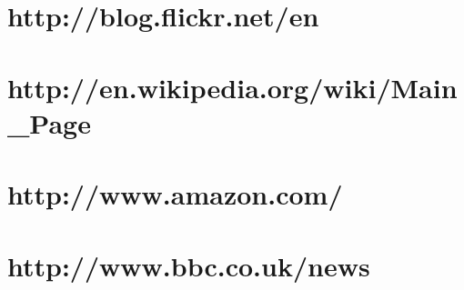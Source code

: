 \documentclass{article}
\begin{document}
  \maketitle
  \tableofcontents

\section{http://blog.flickr.net/en}














\section{http://en.wikipedia.org/wiki/Main_Page}














\section{http://www.amazon.com/}














\section{http://www.bbc.co.uk/news}




\end{document}
